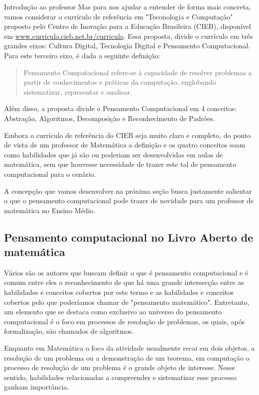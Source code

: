 \begin{apresentacao}{Introdução ao professor}
Mas para nos ajudar a entender de forma mais concreta, vamos considerar o currículo de referência em "Teconologia e Computação"{} proposto pelo Centro de Inovação para a Educação Brasileira (CIEB), disponível em \url{www.curriculo.cieb.net.br/curriculo}. Essa proposta, divide o currículo em três grandes eixos: Cultura Digital, Tecnologia Digital e Pensamento Computacional. Para este terceiro eixo, é dada a seguinte definição:
\begin{quote}
Pensamento Computacional refere-se à capacidade de resolver problemas a partir de conhecimentos e práticas da computação, englobando sistematizar, representar e analisar.
\end{quote}

Além disso, a proposta divide o Pensamento Computacional em 4 conceitos: Abstração, Algoritmos, Decomposição e Reconhecimento de Padrões.

Embora o currículo de referência do CIEB seja muito claro e completo, do ponto de vista de um professor de Matemática a definição e os quatro conceitos soam como habilidades que já são ou poderiam ser desenvolvidas em aulas de matemática, sem que houvesse necessidade de trazer este tal de pensamento computacional para o cenário.

A concepção que vamos desenvolver na próxima seção busca justamente salientar o que o pensamento computacional pode trazer de novidade para um professor de matemática no Ensino Médio.

\subsection{Pensamento computacional no Livro Aberto de matemática}

Vários são os autores que buscam definir o que é pensamento computacional \citep{shute2017} e é comum entre eles o reconhecimento de que há uma grande intersecção entre as habilidades e conceitos cobertos por este termo e as habilidades e conceitos cobertos pelo que poderíamos chamar de "pensamento matemático". Entretanto, um elemento que se destaca como exclusivo ao universo do pensamento computacional é o foco em processos de resolução de problemas, os quais, após formalização, são chamados de algoritmos.

Enquanto em Matemática o foco da atividade usualmente recai em dois objetos, a resolução de um problema ou a demonstração de um teorema, em computação o processo de resolução de um problema é o grande objeto de interesse. Nesse sentido, habilidades relacionadas a compreender e sistematizar esse processo ganham importância.


\end{apresentacao}
